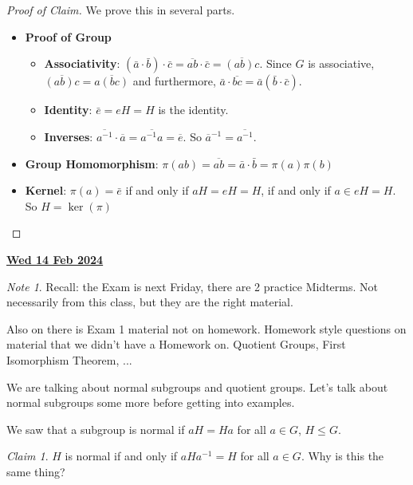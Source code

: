 \documentclass[12pt]{article}
\renewcommand{\date}[1]{\underline{\bf #1}}
\theoremstyle{remark}
\theoremstyle{remark}
\newtheorem{claim}{Claim}
\theoremstyle{remark}
\theoremstyle{remark}
\theoremstyle{remark}
\newtheorem*{note}{Note}
\begin{document}
\begin{proof}[Proof of Claim]
  We prove this in several parts.

  \begin{itemize}
    \item {\bf Proof of Group}

      \begin{itemize}
        \item {\bf Associativity}: $(\bar a \cdot \bar b) \cdot \bar c = \overline
          {ab} \cdot \bar c = \overline{(ab)c}$. Since $G$ is associative,
          $\overline{(ab)c} = \overline{a(bc)}$ and furthermore, $\bar a \cdot
          \overline{bc} = \bar a (\bar b \cdot \bar c)$.

        \item {\bf Identity}: $\bar e = eH = H$ is the identity.
        \item {\bf Inverses}: $\overline{a^{-1}} \cdot \overline{a} =
          \overline{a^{-1} a} = \overline{e}$. So $\overline{a}^{-1} =
          \overline{a^{-1}}$.
      \end{itemize}

    \item {\bf Group Homomorphism}: $\pi(ab) = \overline{ab} = \bar a \cdot \bar b
      = \pi(a) \pi(b)$

    \item {\bf Kernel}: $\pi(a) = \bar e$ if and only if $aH = eH = H$, if and
      only if $a \in eH = H$. So $H = \ker(\pi)$
  \end{itemize}
\end{proof}

\date {Wed 14 Feb 2024}

\begin{note}
  Recall: the Exam is next Friday, there are 2 practice Midterms. Not
  necessarily from this class, but they are the right material.

  Also on there is Exam 1 material not on homework. Homework style questions on
  material that we didn't have a Homework on. Quotient Groups, First Isomorphism
  Theorem, ...
\end{note}

We are talking about normal subgroups and quotient groups. Let's talk about
normal subgroups some more before getting into examples.

We saw that a subgroup is normal if $aH = Ha$ for all $a \in G$, $H \le G$.

\begin{claim}
  $H$ is normal if and only if $aHa^{-1} = H$ for all $a \in G$.
  Why is this the same thing?
\end{claim}
\end{document}
